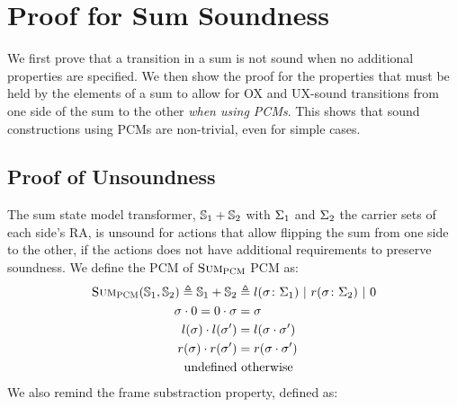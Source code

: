 \chapter{Proof for Sum Soundness} \label{ap:sum-soundness}

We first prove that a transition in a sum is not sound when no additional properties are specified. We then show the proof for the properties that must be held by the elements of a sum to allow for OX and UX-sound transitions from one side of the sum to the other \emph{when using PCMs}. This shows that sound constructions using PCMs are non-trivial, even for simple cases.

\section{Proof of Unsoundness}

The sum state model transformer, $\mathbb S_1 + \mathbb S_2$ with $\Sigma_1$ and $\Sigma_2$ the carrier sets of each side's RA, is unsound for actions that allow flipping the sum from one side to the other, if the actions does not have additional requirements to preserve soundness. We define the PCM of $\textsc{Sum}_{\textsc{PCM}}$ PCM as: \begin{align*}
	\textsc{Sum}_{\textsc{PCM}}(\mathbb S_1, \mathbb S_2) \triangleq \mathbb S_1 + \mathbb S_2 &\triangleq l(\sigma\colon \Sigma_1) ~|~ r(\sigma\colon \Sigma_2) ~|~ 0 \\
	\sigma \cdot 0 = 0 \cdot \sigma &= \sigma\\
	l(\sigma) \cdot l(\sigma') &= l(\sigma\cdot\sigma')\\
	r(\sigma) \cdot r(\sigma') &= r(\sigma\cdot\sigma')\\
	\text{undefined}&\text{ otherwise}
\end{align*} We also remind the frame substraction property, defined as:

\newcommand{\swap}[0]{\code{swap}}
\newcommand{\execswap}[2]{\ppexecc{\swap}{#1}{#2}}

